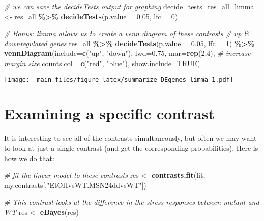 \documentclass[
]{book}
\newenvironment{Shaded}{\begin{snugshade}}{\end{snugshade}}
\newcommand{\AttributeTok}[1]{\textcolor[rgb]{0.13,0.29,0.53}{#1}}
\newcommand{\CommentTok}[1]{\textcolor[rgb]{0.56,0.35,0.01}{\textit{#1}}}
\newcommand{\ConstantTok}[1]{\textcolor[rgb]{0.56,0.35,0.01}{#1}}
\newcommand{\DecValTok}[1]{\textcolor[rgb]{0.00,0.00,0.81}{#1}}
\newcommand{\FloatTok}[1]{\textcolor[rgb]{0.00,0.00,0.81}{#1}}
\newcommand{\FunctionTok}[1]{\textcolor[rgb]{0.13,0.29,0.53}{\textbf{#1}}}
\newcommand{\NormalTok}[1]{#1}
\newcommand{\OtherTok}[1]{\textcolor[rgb]{0.56,0.35,0.01}{#1}}
\newcommand{\SpecialCharTok}[1]{\textcolor[rgb]{0.81,0.36,0.00}{\textbf{#1}}}
\newcommand{\StringTok}[1]{\textcolor[rgb]{0.31,0.60,0.02}{#1}}
\begin{document}
\begin{Shaded}
\begin{Highlighting}[]
\CommentTok{\# we can save the decideTests output for graphing}
\NormalTok{decide\_tests\_res\_all\_limma }\OtherTok{\textless{}{-}}\NormalTok{ res\_all }\SpecialCharTok{\%\textgreater{}\%}
  \FunctionTok{decideTests}\NormalTok{(}\AttributeTok{p.value =} \FloatTok{0.05}\NormalTok{, }\AttributeTok{lfc =} \DecValTok{0}\NormalTok{) }
  
\CommentTok{\# Bonus: limma allows us to create a venn diagram of these contrasts }
\CommentTok{\# up \& downregulated genes}
\NormalTok{res\_all }\SpecialCharTok{\%\textgreater{}\%}
  \FunctionTok{decideTests}\NormalTok{(}\AttributeTok{p.value =} \FloatTok{0.05}\NormalTok{, }\AttributeTok{lfc =} \DecValTok{1}\NormalTok{) }\SpecialCharTok{\%\textgreater{}\%} 
  \FunctionTok{vennDiagram}\NormalTok{(}\AttributeTok{include=}\FunctionTok{c}\NormalTok{(}\StringTok{"up"}\NormalTok{, }\StringTok{"down"}\NormalTok{),}
              \AttributeTok{lwd=}\FloatTok{0.75}\NormalTok{,}
              \AttributeTok{mar=}\FunctionTok{rep}\NormalTok{(}\DecValTok{2}\NormalTok{,}\DecValTok{4}\NormalTok{), }\CommentTok{\# increase margin size}
              \AttributeTok{counts.col=} \FunctionTok{c}\NormalTok{(}\StringTok{"red"}\NormalTok{, }\StringTok{"blue"}\NormalTok{),}
              \AttributeTok{show.include=}\ConstantTok{TRUE}\NormalTok{)}
\end{Highlighting}
\end{Shaded}

\texttt{[image: \_main\_files/figure-latex/summarize-DEgenes-limma-1.pdf]}

\hypertarget{examining-a-specific-contrast}{%
\section{Examining a specific contrast}\label{examining-a-specific-contrast}}

It is interesting to see all of the contrasts simultaneously, but often
we may want to look at just a single contrast (and get the corresponding
probabilities). Here is how we do that:

\begin{Shaded}
\begin{Highlighting}[]
\CommentTok{\# fit the linear model to these contrasts}
\NormalTok{res }\OtherTok{\textless{}{-}} \FunctionTok{contrasts.fit}\NormalTok{(fit, my.contrasts[,}\StringTok{"EtOHvsWT.MSN24ddvsWT"}\NormalTok{])}

\CommentTok{\# This contrast looks at the difference in the stress responses between mutant and WT}
\NormalTok{res }\OtherTok{\textless{}{-}} \FunctionTok{eBayes}\NormalTok{(res)}
\end{Highlighting}
\end{Shaded}
\end{document}
